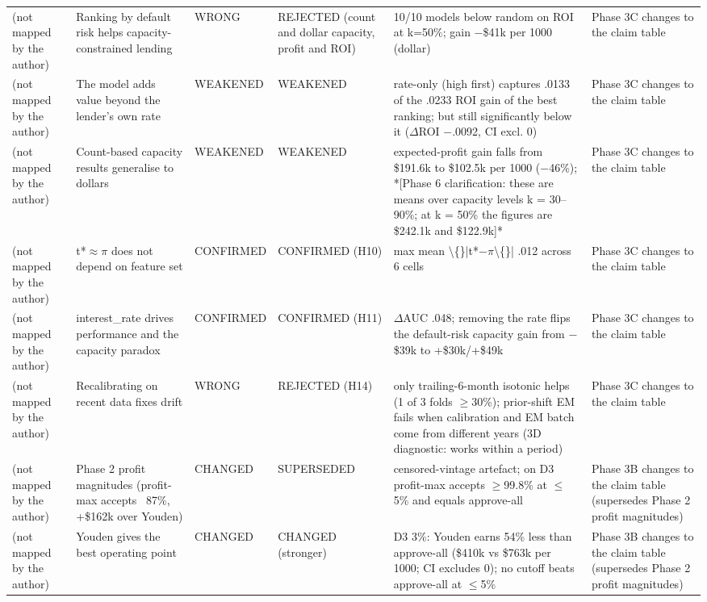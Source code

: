 \begin{table}[t]
\begin{tabular}{lp{5.2cm}lp{5.2cm}p{5.2cm}p{5.2cm}}
(not mapped by the author) & Ranking by default risk helps capacity-constrained lending & WRONG & REJECTED (count and dollar capacity, profit and ROI) & 10/10 models below random on ROI at k=50\%; gain $-$\$41k per 1000 (dollar) & Phase 3C changes to the claim table \\
(not mapped by the author) & The model adds value beyond the lender's own rate & WEAKENED & WEAKENED & rate-only (high first) captures .0133 of the .0233 ROI gain of the best ranking; but still significantly below it ($\Delta$ROI $-$.0092, CI excl. 0) & Phase 3C changes to the claim table \\
(not mapped by the author) & Count-based capacity results generalise to dollars & WEAKENED & WEAKENED & expected-profit gain falls from \$191.6k to \$102.5k per 1000 ($-$46\%); *[Phase 6 clarification: these are means over capacity levels k = 30--90\%; at k = 50\% the figures are \$242.1k and \$122.9k]* & Phase 3C changes to the claim table \\
(not mapped by the author) & t*$\approx$$\pi$ does not depend on feature set & CONFIRMED & CONFIRMED (H10) & max mean \textbackslash\{\}|t*$-$$\pi$\textbackslash\{\}| .012 across 6 cells & Phase 3C changes to the claim table \\
(not mapped by the author) & interest\_rate drives performance and the capacity paradox & CONFIRMED & CONFIRMED (H11) & $\Delta$AUC .048; removing the rate flips the default-risk capacity gain from $-$\$39k to +\$30k/+\$49k & Phase 3C changes to the claim table \\
(not mapped by the author) & Recalibrating on recent data fixes drift & WRONG & REJECTED (H14) & only trailing-6-month isotonic helps (1 of 3 folds $\geq$30\%); prior-shift EM fails when calibration and EM batch come from different years (3D diagnostic: works within a period) & Phase 3C changes to the claim table \\
(not mapped by the author) & Phase 2 profit magnitudes (profit-max accepts ~87\%, +\$162k over Youden) & CHANGED & SUPERSEDED & censored-vintage artefact; on D3 profit-max accepts $\geq$99.8\% at $\leq$5\% and equals approve-all & Phase 3B changes to the claim table (supersedes Phase 2 profit magnitudes) \\
(not mapped by the author) & Youden gives the best operating point & CHANGED & CHANGED (stronger) & D3 3\%: Youden earns 54\% less than approve-all (\$410k vs \$763k per 1000; CI excludes 0); no cutoff beats approve-all at $\leq$5\% & Phase 3B changes to the claim table (supersedes Phase 2 profit magnitudes) \\

\end{tabular}
\end{table}
